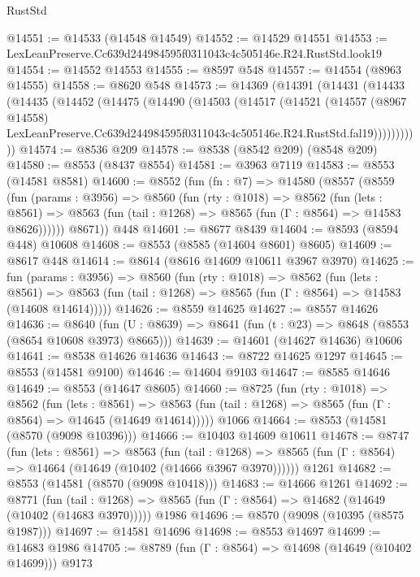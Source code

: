 \begin{lexlean}{RustStd}
\begin{coremodule}
@14551 := @14533 (@14548 @14549)
@14552 := @14529 @14551
@14553 := LexLeanPreserve.Cc639d244984595f0311043c4c505146e.R24.RustStd.look19
@14554 := @14552 @14553
@14555 := @8597 @548
@14557 := @14554 (@8963 @14555)
@14558 := @8620 @548
@14573 := @14369
    (@14391
      (@14431
        (@14433
          (@14435
            (@14452
              (@14475
                (@14490
                  (@14503
                    (@14517
                      (@14521
                        (@14557
                          (@8967 @14558)
                          LexLeanPreserve.Cc639d244984595f0311043c4c505146e.R24.RustStd.fal19)))))))))))
@14574 := @8536 @209
@14578 := @8538 (@8542 @209) (@8548 @209)
@14580 := @8553 (@8437 @8554)
@14581 := @3963 @7119
@14583 := @8553 (@14581 @8581)
@14600 := @8552
    (fun (fn : @7) =>
    @14580
      (@8557
        (@8559
          (fun (params : @3956) =>
          @8560
            (fun (rty : @1018) =>
            @8562
              (fun (lets : @8561) =>
              @8563 (fun (tail : @1268) => @8565 (fun (Γ : @8564) => @14583 @8626))))))
        @8671))
    @448
@14601 := @8677 @8439
@14604 := @8593 (@8594 @448) @10608
@14608 := @8553 (@8585 (@14604 @8601) @8605)
@14609 := @8617 @448
@14614 := @8614 (@8616 @14609 @10611 @3967 @3970)
@14625 := fun (params : @3956) =>
  @8560
    (fun (rty : @1018) =>
    @8562
      (fun (lets : @8561) =>
      @8563 (fun (tail : @1268) => @8565 (fun (Γ : @8564) => @14583 (@14608 @14614)))))
@14626 := @8559 @14625
@14627 := @8557 @14626
@14636 := @8640
    (fun (U : @8639) => @8641 (fun (t : @23) => @8648 (@8553 (@8654 @10608 @3973) @8665)))
@14639 := @14601 (@14627 @14636) @10606
@14641 := @8538 @14626 @14636
@14643 := @8722 @14625 @1297
@14645 := @8553 (@14581 @9100)
@14646 := @14604 @9103
@14647 := @8585 @14646
@14649 := @8553 (@14647 @8605)
@14660 := @8725
    (fun (rty : @1018) =>
    @8562
      (fun (lets : @8561) =>
      @8563 (fun (tail : @1268) => @8565 (fun (Γ : @8564) => @14645 (@14649 @14614)))))
    @1066
@14664 := @8553 (@14581 (@8570 (@9098 @10396)))
@14666 := @10403 @14609 @10611
@14678 := @8747
    (fun (lets : @8561) =>
    @8563
      (fun (tail : @1268) =>
      @8565 (fun (Γ : @8564) => @14664 (@14649 (@10402 (@14666 @3967 @3970))))))
    @1261
@14682 := @8553 (@14581 (@8570 (@9098 @10418)))
@14683 := @14666 @1261
@14692 := @8771
    (fun (tail : @1268) => @8565 (fun (Γ : @8564) => @14682 (@14649 (@10402 (@14683 @3970)))))
    @1986
@14696 := @8570 (@9098 (@10395 (@8575 @1987)))
@14697 := @14581 @14696
@14698 := @8553 @14697
@14699 := @14683 @1986
@14705 := @8789 (fun (Γ : @8564) => @14698 (@14649 (@10402 @14699))) @9173

\end{coremodule}
\end{lexlean}

